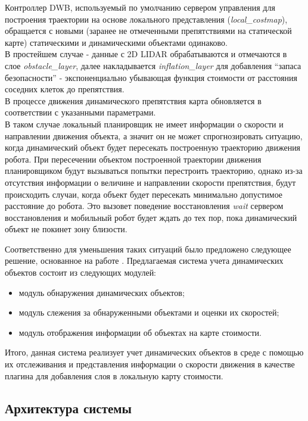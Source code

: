 Контроллер DWB, используемый по умолчанию сервером управления для построения траектории на основе локального представления (\textit{local\_costmap}), обращается с новыми (заранее не отмеченными препятствиями на статической карте) статическими и динамическими объектами одинаково. \\
В простейшем случае - данные с 2D LIDAR обрабатываются и отмечаются в слое \textit{obstacle\_layer}, далее накладывается \textit{inflation\_layer} для добавления “запаса безопасности” - экспоненциально убывающая функция стоимости от расстояния соседних клеток до препятствия. \\ 
В процессе движения динамического препятствия карта обновляется в соответствии с указанными параметрами. \\
В таком случае локальный планировщик не имеет информации о скорости и направлении движения объекта, а значит он не может спрогнозировать ситуацию, когда динамический объект будет пересекать построенную траекторию движения робота. При пересечении объектом построенной траектории движения планировщиком будут вызываться попытки перестроить траекторию, однако из-за отсутствия информации о величине и направлении скорости препятствия, будут происходить случаи, когда объект будет пересекать минимально допустимое расстояние до робота. Это вызовет поведение восстановления \textit{wait} сервером восстановления и мобильный робот будет ждать до тех пор, пока динамический объект не покинет зону близости.

Соответственно для уменьшения таких ситуаций было предложено следующее решение, основанное на работе \cite{albers2019online}. Предлагаемая система учета динамических объектов состоит из следующих модулей:
\begin{itemize}
    \item модуль обнаружения динамических объектов;
    \item модуль слежения за обнаруженными объектами и оценки их скоростей;
    \item модуль отображения информации об объектах на карте стоимости.
\end{itemize}

Итого, данная система реализует учет динамических объектов в среде с помощью их отслеживания и представления информации о скорости движения в качестве плагина для добавления слоя в локальную карту стоимости.

\subsection{Архитектура системы}

